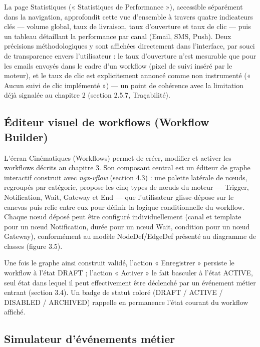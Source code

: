 \documentclass[12pt,a4paper]{report}
\begin{document}
La page Statistiques (« Statistiques de Performance »), accessible séparément dans la navigation, approfondit cette vue d'ensemble à travers quatre indicateurs clés --- volume global, taux de livraison, taux d'ouverture et taux de clic --- puis un tableau détaillant la performance par canal (Email, SMS, Push). Deux précisions méthodologiques y sont affichées directement dans l'interface, par souci de transparence envers l'utilisateur : le taux d'ouverture n'est mesurable que pour les emails envoyés dans le cadre d'un workflow (pixel de suivi inséré par le moteur), et le taux de clic est explicitement annoncé comme non instrumenté (« Aucun suivi de clic implémenté ») --- un point de cohérence avec la limitation déjà signalée au chapitre 2 (section 2.5.7, Traçabilité).

\subsection{Éditeur visuel de workflows (Workflow Builder)}

L'écran Cinématiques (Workflows) permet de créer, modifier et activer les workflows décrits au chapitre 3. Son composant central est un éditeur de graphe interactif construit avec \textit{ngx-vflow} (section 4.3) : une palette latérale de n\oe uds, regroupés par catégorie, propose les cinq types de n\oe uds du moteur --- Trigger, Notification, Wait, Gateway et End --- que l'utilisateur glisse-dépose sur le canevas puis relie entre eux pour définir la logique conditionnelle du workflow. Chaque n\oe ud déposé peut être configuré individuellement (canal et template pour un n\oe ud Notification, durée pour un n\oe ud Wait, condition pour un n\oe ud Gateway), conformément au modèle NodeDef/EdgeDef présenté au diagramme de classes (figure 3.5).

Une fois le graphe ainsi construit validé, l'action « Enregistrer » persiste le workflow à l'état DRAFT ; l'action « Activer » le fait basculer à l'état ACTIVE, seul état dans lequel il peut effectivement être déclenché par un événement métier entrant (section 3.4). Un badge de statut coloré (DRAFT / ACTIVE / DISABLED / ARCHIVED) rappelle en permanence l'état courant du workflow affiché.

\subsection{Simulateur d'événements métier}
\end{document}
